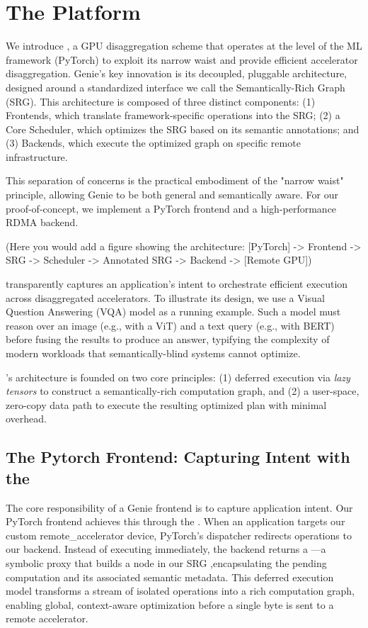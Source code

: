 \section{The \sys Platform}
\label{sec:framework}

We introduce \sys, a GPU disaggregation scheme that operates at the level of the ML framework (PyTorch) to exploit its narrow waist and provide efficient accelerator disaggregation.
Genie's key innovation is its decoupled, pluggable architecture, designed around a standardized interface we call the Semantically-Rich Graph (SRG). 
This architecture is composed of three distinct components: 
(1) Frontends, which translate framework-specific operations into the SRG; 
(2) a Core Scheduler, which optimizes the SRG based on its semantic annotations; and 
(3) Backends, which execute the optimized graph on specific remote infrastructure.

This separation of concerns is the practical embodiment of the "narrow waist" principle, allowing Genie to be both general and semantically aware. For our proof-of-concept, we implement a PyTorch frontend and a high-performance RDMA backend.

(Here you would add a figure showing the architecture: [PyTorch] -> Frontend -> SRG -> Scheduler -> Annotated SRG -> Backend -> [Remote GPU])

\sys transparently captures an application's intent to orchestrate efficient execution across disaggregated accelerators.
To illustrate its design, we use a Visual Question Answering (VQA) model as a running example. Such a model must reason over an image (e.g., with a ViT) and a text query (e.g., with BERT) before fusing the results to produce an answer, typifying the complexity of modern workloads that semantically-blind systems cannot optimize.

\sys's architecture is founded on two core principles: (1) deferred execution via \emph{lazy tensors} to construct a semantically-rich computation graph, and (2) a user-space, zero-copy data path to execute the resulting optimized plan with minimal overhead.

\subsection{The Pytorch Frontend: Capturing Intent with the \lazytensor}
\label{ssec:lazy_tensor}

The core responsibility of a Genie frontend is to capture application intent. Our PyTorch frontend achieves this through the \lazytensor. When an application targets our custom remote_accelerator device, PyTorch's dispatcher redirects operations to our backend. 
Instead of executing immediately, the backend returns a \lazytensor—a symbolic proxy that builds a node in our SRG
,encapsulating the pending computation and its associated semantic metadata. 
This deferred execution model transforms a stream of isolated operations into a rich computation graph, enabling global, context-aware optimization before a single byte is sent to a remote accelerator.

